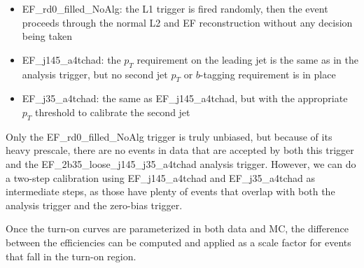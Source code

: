 \begin{itemize}
    \item EF\_rd0\_filled\_NoAlg: the L1 trigger is fired randomly, then the event proceeds
    through the normal L2 and EF reconstruction without any decision being taken
    \item EF\_j145\_a4tchad: the $p_T$ requirement on the leading jet is the same as in 
    the analysis trigger, but no second jet $p_T$ or $b$-tagging requirement is in place
    \item EF\_j35\_a4tchad: the same as EF\_j145\_a4tchad, but with the appropriate $p_T$ 
    threshold to calibrate the second jet
\end{itemize}

Only the EF\_rd0\_filled\_NoAlg trigger is truly unbiased, but because of its heavy prescale,
there are no events in data that are accepted by both this trigger and the EF\_2b35\_loose\_j145\_j35\_a4tchad
analysis trigger.  However, we can do a two-step calibration using EF\_j145\_a4tchad and
EF\_j35\_a4tchad as intermediate steps, as those have plenty of events that overlap 
with both the analysis trigger and the zero-bias trigger.

Once the turn-on curves are parameterized in both data and MC, the difference between the efficiencies
can be computed and applied as a scale factor for events that fall in the turn-on region.  


